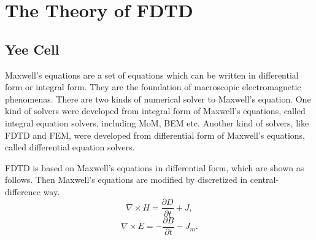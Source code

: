 
\chapter{The Theory of FDTD}
\section{Yee Cell}
Maxwell's equations are a set of equations which can be written in differential form or integral form. They are the foundation of macroscopic electromagnetic phenomenas. There are two kinds of numerical solver to Maxwell's equation. One kind of solvers were developed from integral form of Maxwell's equations, called integral equation solvers, including MoM, BEM etc. Another kind of solvers, like FDTD and FEM, were developed from differential form of Maxwell's equations, called differential equation solvers.

FDTD is based on Maxwell's equations in differential form, which are shown as follows. Then Maxwell's equations are modified by discretized in central-difference way.
\begin{equation}\label{ch2 eq:maxwellH}
\nabla\times\mathbf{\mathit{H}}=\frac{\partial \mathbb{\mathit{D}}}{\partial t}+\mathbf{\mathit{J}},
\end{equation}
\begin{equation}\label{ch2 eq:maxwellE}
\nabla\times\mathbf{\mathit{E}}=-\frac{\partial \mathbb{\mathit{B}}}{\partial t}-\mathbf{\mathit{J}}_m.
\end{equation}


